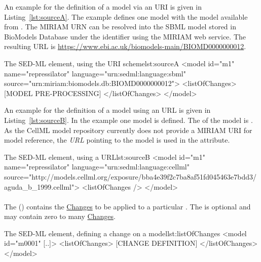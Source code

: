 An example for the definition of a model via an URI is given in Listing~\ref{lst:sourceA}. The example defines one model  with the model  available from . The MIRIAM URN can be resolved into the SBML model stored in BioModels Database under the identifier  using the MIRIAM web service. The resulting URL is \url{https://www.ebi.ac.uk/biomodels-main/BIOMD0000000012}.

\begin{myXmlLst}{The SED-ML  element, using the URI scheme}{lst:sourceA}
<model id="m1" name="repressilator" language="urn:sedml:language:sbml" 
	source="urn:miriam:biomodels.db:BIOMD0000000012">
	<listOfChanges>
		[MODEL PRE-PROCESSING]
	</listOfChanges>
</model>
\end{myXmlLst}

An example for the definition of a model using an URL is given in Listing~\ref{lst:sourceB}. In the example one model is defined. The  of the model is . As the CellML model repository currently does not provide a MIRIAM URI for model reference, the \emph{URL} pointing to the model is used in the  attribute.

\begin{myXmlLst}{The SED-ML  element, using a URL}{lst:sourceB}
<model id="m1" name="repressilator" language="urn:sedml:language:cellml" 
	source="http://models.cellml.org/exposure/bba4e39f2c7ba8af51fd045463e7bdd3/aguda_b_1999.cellml">
	<listOfChanges />
</model>
\end{myXmlLst}



\paragraph*{}
\label{sec:changesModel}
The  () contains the \hyperref[class:change]{Changes} to be applied to a particular \Model. The  is optional and may contain zero to many \hyperref[class:change]{Changes}.

\begin{myXmlLst}{The SED-ML  element, defining a change on a model}{lst:listOfChanges}
<model id="m0001" [..]>
	<listOfChanges>
		[CHANGE DEFINITION]
	</listOfChanges>
</model>
\end{myXmlLst}

